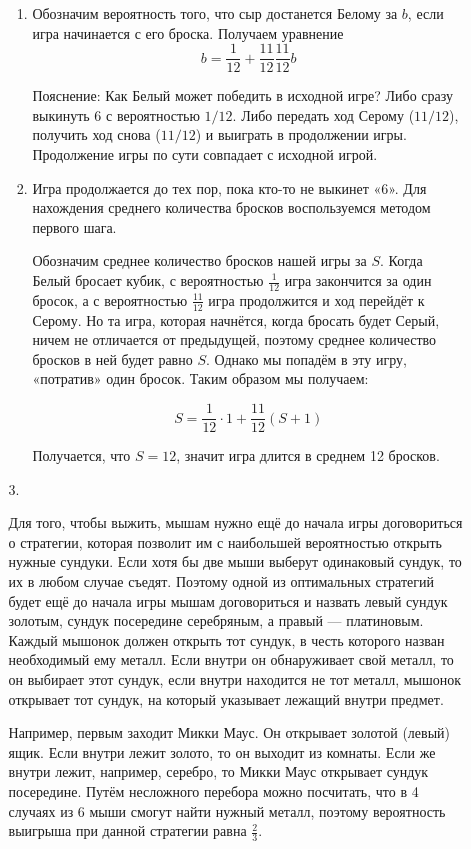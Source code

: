 \begin{enumerate}
\begin{enumerate}
\begin{enumerate}
	\item Обозначим вероятность того, что сыр достанется Белому за $b$, если игра начинается с его броска. Получаем уравнение
\[
	b = \frac{1}{12} + \frac{11}{12} \frac{11}{12} b
\]

Пояснение: Как Белый может победить в исходной игре? Либо сразу выкинуть 6 с вероятностью $1/12$. Либо передать ход Серому ($11/12$), получить ход снова ($11/12$) и выиграть в продолжении игры. Продолжение игры по сути совпадает с исходной игрой.

\item Игра продолжается до тех пор, пока кто-то не выкинет «6». Для нахождения среднего количества бросков воспользуемся методом первого шага.

Обозначим среднее количество бросков нашей игры за $S$. Когда Белый бросает кубик, с вероятностью $\frac{1}{12}$ игра закончится за один бросок, а с вероятностью $\frac{11}{12}$ игра продолжится и ход перейдёт к Серому. Но та игра, которая начнётся, когда бросать будет Серый, ничем не отличается от предыдущей, поэтому среднее количество бросков в ней будет равно $S$. Однако мы попадём в эту игру, «потратив» один бросок. Таким образом мы получаем:

\[
S = \frac{1}{12} \cdot 1 + \frac{11}{12}(S +1)
\]

Получается, что $S = 12$, значит игра длится в среднем 12 бросков.
\end{enumerate}

\item[3.]

Для того, чтобы выжить, мышам нужно ещё до начала игры договориться о стратегии, которая позволит им с наибольшей вероятностью открыть нужные сундуки. Если хотя бы две мыши выберут одинаковый сундук, то их в любом случае съедят. Поэтому одной из оптимальных стратегий будет ещё до начала игры мышам договориться и назвать левый сундук золотым, сундук посередине серебряным, а правый — платиновым. Каждый мышонок должен открыть тот сундук, в честь которого назван необходимый ему металл. Если внутри он обнаруживает свой металл, то он выбирает этот сундук, если внутри находится не тот металл, мышонок открывает тот сундук, на который указывает лежащий внутри предмет.

Например, первым заходит Микки Маус. Он открывает золотой (левый) ящик. Если внутри лежит золото, то он выходит из комнаты. Если же внутри лежит, например, серебро, то Микки Маус открывает сундук посередине. Путём несложного перебора можно посчитать, что в 4 случаях из 6 мыши смогут найти нужный металл, поэтому вероятность выигрыша при данной стратегии равна $\frac{2}{3}$.


\end{enumerate}
\end{enumerate}
